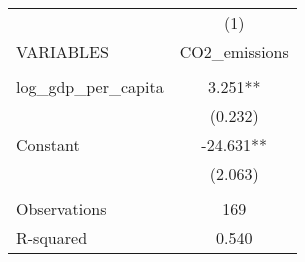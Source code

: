 \begin{tabular}{lc} \hline
 & (1) \\
VARIABLES & CO2\_emissions \\ \hline
 &  \\
log\_gdp\_per\_capita & 3.251** \\
 & (0.232) \\
Constant & -24.631** \\
 & (2.063) \\
 &  \\
Observations & 169 \\
 R-squared & 0.540 \\ \hline
\end{tabular}
